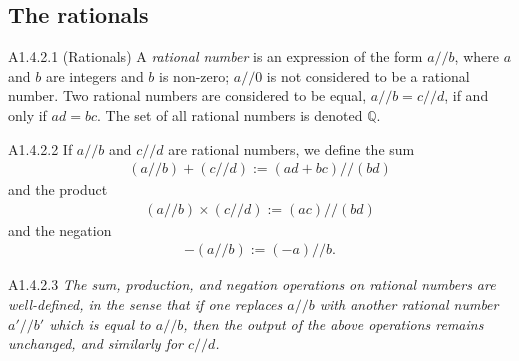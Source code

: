 
\subsection{The rationals}
\begin{definition}{A1.4.2.1}
    (Rationals) A \emph{rational number} is an expression of the form $a // b$, where $a$ and $b$ are integers
    and $b$ is non-zero; $a // 0$ is not considered to be a rational number.
    Two rational numbers are considered to be equal, $a // b=c // d$, if and only if
    $ad=bc$. The set of all rational numbers is denoted $\mathbb{Q}$.
\end{definition}

\begin{definition}{A1.4.2.2}
    If $a // b$ and $c // d$ are rational numbers, we define the sum
    \begin{align*}
        (a // b) + (c // d) := (ad+bc) // (bd)
    \end{align*}
    and the product
    \begin{align*}
        (a // b) \times (c // d) := (ac) // (bd)
    \end{align*}
    and the negation
    \begin{align*}
        -(a // b) := (-a) // b.
    \end{align*}
\end{definition}

\begin{lemma}{A1.4.2.3}
    \emph{The sum, production, and negation operations on rational numbers are well-defined, in the sense that if one
    replaces $a // b$ with another rational number $a' // b'$ which is equal to $a // b$, then the output of the above
    operations remains unchanged, and similarly for $c // d$.}
\end{lemma}

